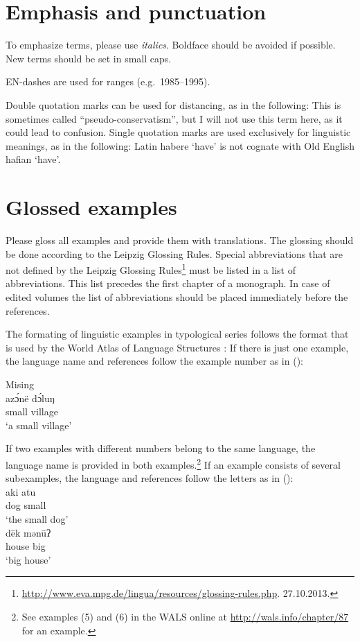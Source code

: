 \section{Emphasis and punctuation}

To emphasize terms, please use \emph{italics}. Boldface should be avoided if
possible. New terms should be set in {\sc small caps}.

EN-dashes are used for ranges (e.g.\ 1985–1995).

Double quotation marks can be used for distancing, as in the following:
\ea
This is sometimes called ``pseudo-conservatism'', but I will not use this term here, as it could lead
to confusion.
\z
Single quotation marks are used exclusively for linguistic meanings, as in the following:
\ea
Latin habere `have' is not cognate with Old English hafian `have'.
\z

\section{Glossed examples}

Please gloss all examples and provide them with translations. The glossing should be done according
to the Leipzig Glossing Rules. Special abbreviations that are not defined by the Leipzig
Glossing Rules\footnote{
\url{http://www.eva.mpg.de/lingua/resources/glossing-rules.php}. 27.10.2013.
}
 must be listed in a list of abbreviations. This list precedes the first chapter of a
monograph. In case of edited volumes the list of abbreviations should be placed immediately
before the references.

The formating of linguistic examples in typological series follows the format that is used by the
World Atlas of Language Structures \citep{DM2013a-ed}: If there is just one example, the language name and references
follow the example number as in ():

{\def\exfont{\normalsize\itshape}
\ea\label{ex-typology}
{\rm Mising \citep[69]{Prasad91a}}\\
\gll azɔ́në dɔ́luŋ\\
     small village\\ 
\glt `a small village' 
\z

If two examples with different numbers belong to the same language, the language name is provided in
both examples.\footnote{
  See examples (5) and (6) in the WALS online at \url{http://wals.info/chapter/87} for an example.
}
If an example consists of several subexamples, the language and references follow the letters as in
():
\eal
{}\\
\gll aki atu\\ 
     dog small\\ 
\glt ‘the small dog’ 
\\ 
\gll dēk mənūʔ\\
     house big\\
\glt ‘big house’ 
\zl
}

